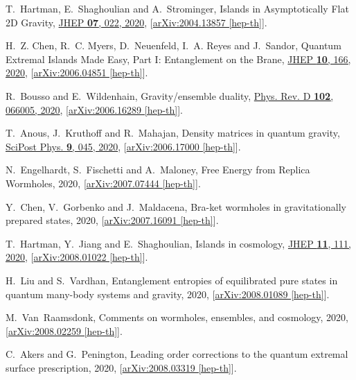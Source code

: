 \documentclass[11pt]{article}
\numberwithin{equation}{section}
\begin{document}
\begin{thebibliography}{10}
T.~Hartman, E.~Shaghoulian and A.~Strominger, {{Islands in Asymptotically Flat
  2D Gravity}}, \href{http://dx.doi.org/10.1007/JHEP07(2020)022}{JHEP {\bf 07},
  022, 2020}, [\href{http://arxiv.org/abs/arXiv:2004.13857}{{arXiv:2004.13857
  [hep-th]}}].

H.~Z. Chen, R.~C. Myers, D.~Neuenfeld, I.~A. Reyes and J.~Sandor, {{Quantum
  Extremal Islands Made Easy, Part I: Entanglement on the Brane}},
  \href{http://dx.doi.org/10.1007/JHEP10(2020)166}{JHEP {\bf 10}, 166, 2020},
  [\href{http://arxiv.org/abs/arXiv:2006.04851}{{arXiv:2006.04851 [hep-th]}}].

R.~Bousso and E.~Wildenhain, {{Gravity/ensemble duality}},
  \href{http://dx.doi.org/10.1103/PhysRevD.102.066005}{Phys. Rev. D {\bf 102},
  066005, 2020},
  [\href{http://arxiv.org/abs/arXiv:2006.16289}{{arXiv:2006.16289 [hep-th]}}].

T.~Anous, J.~Kruthoff and R.~Mahajan, {{Density matrices in quantum gravity}},
  \href{http://dx.doi.org/10.21468/SciPostPhys.9.4.045}{SciPost Phys. {\bf 9},
  045, 2020}, [\href{http://arxiv.org/abs/arXiv:2006.17000}{{arXiv:2006.17000
  [hep-th]}}].

N.~Engelhardt, S.~Fischetti and A.~Maloney, {{Free Energy from Replica
  Wormholes}},  2020,
  [\href{http://arxiv.org/abs/arXiv:2007.07444}{{arXiv:2007.07444 [hep-th]}}].

Y.~Chen, V.~Gorbenko and J.~Maldacena, {{Bra-ket wormholes in gravitationally
  prepared states}},  2020,
  [\href{http://arxiv.org/abs/arXiv:2007.16091}{{arXiv:2007.16091 [hep-th]}}].

T.~Hartman, Y.~Jiang and E.~Shaghoulian, {{Islands in cosmology}},
  \href{http://dx.doi.org/10.1007/JHEP11(2020)111}{JHEP {\bf 11}, 111, 2020},
  [\href{http://arxiv.org/abs/arXiv:2008.01022}{{arXiv:2008.01022 [hep-th]}}].

H.~Liu and S.~Vardhan, {{Entanglement entropies of equilibrated pure states in
  quantum many-body systems and gravity}},  2020,
  [\href{http://arxiv.org/abs/arXiv:2008.01089}{{arXiv:2008.01089 [hep-th]}}].

M.~Van~Raamsdonk, {{Comments on wormholes, ensembles, and cosmology}},  2020,
  [\href{http://arxiv.org/abs/arXiv:2008.02259}{{arXiv:2008.02259 [hep-th]}}].

C.~Akers and G.~Penington, {{Leading order corrections to the quantum extremal
  surface prescription}},  2020,
  [\href{http://arxiv.org/abs/arXiv:2008.03319}{{arXiv:2008.03319 [hep-th]}}].


\end{thebibliography}
\end{document}
